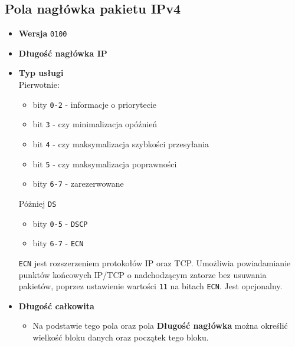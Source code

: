 \documentclass[../sk-egzamin.tex]{subfiles}
\begin{document}
\subsection*{Pola nagłówka pakietu IPv4 }
\begin{itemize}
    \item \textbf{Wersja} \texttt{0100} 
    \item \textbf{Długość nagłówka IP}
           
    \item \textbf{Typ usługi} 
          \\
          Pierwotnie:
          \begin{itemize}
              \item bity \texttt{0-2} - informacje o priorytecie
              \item bit \texttt{3} - czy minimalizacja opóźnień
              \item bit \texttt{4} - czy maksymalizacja szybkości przesyłania
              \item bit \texttt{5} - czy maksymalizacja poprawności\\
              \item bity \texttt{6-7} - zarezerwowane
          \end{itemize}
          Póżniej \texttt{DS} 
          \begin{itemize}
              \item bity \texttt{0-5} - \texttt{DSCP}
              \item bity \texttt{6-7} - \texttt{ECN}
          \end{itemize}
         \texttt{ECN} jest rozszerzeniem protokołów IP oraz TCP.
         Umożliwia powiadamianie punktów końcowych IP/TCP o nadchodzącym zatorze
         bez usuwania pakietów, poprzez ustawienie wartości \texttt{11} na
         bitach \texttt{ECN}. Jest opcjonalny.
    \item \textbf{Długość całkowita} 
    \begin{itemize}
        \item Na podstawie tego pola oraz pola \textbf{Długość nagłówka}
        można określić wielkość bloku danych oraz początek tego bloku.
    \end{itemize}


\end{itemize}
\end{document}
